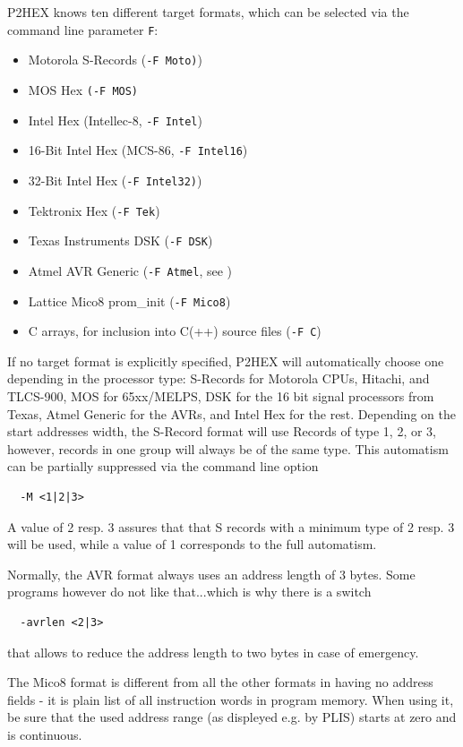 \documentclass[12pt,twoside]{report}
\newcommand{\tty}[1]{{\tt #1}}
\begin{document}
P2HEX knows ten different target formats, which can be selected via the
command line parameter \tty{F}:
\begin{itemize}
\item{Motorola S-Records (\tty{-F Moto)})}
\item{MOS Hex \tty{(-F MOS)}}
\item{Intel Hex (Intellec-8, \tty{-F Intel})}
\item{16-Bit Intel Hex (MCS-86, \tty{-F Intel16})}
\item{32-Bit Intel Hex (\tty{-F Intel32)})}
\item{Tektronix Hex (\tty{-F Tek})}
\item{Texas Instruments DSK (\tty{-F DSK})}
\item{Atmel AVR Generic (\tty{-F Atmel}, see \cite{AVRObj})}
\item{Lattice Mico8 prom\_init (\tty{-F Mico8})}
\item{C arrays, for inclusion into C(++) source files (\tty{-F C})}
\end{itemize}
If no target format is explicitly specified, P2HEX will automatically
choose one depending in the processor type:  S-Records for Motorola
CPUs, Hitachi, and TLCS-900, MOS for 65xx/MELPS, DSK for the 16 bit
signal processors from Texas, Atmel Generic for the AVRs, and Intel Hex
for the rest.  Depending on the start addresses width, the S-Record
format will use Records of type 1, 2, or 3, however, records in one
group will always be of the same type.  This automatism can be partially
suppressed via the command line option
\begin{verbatim}
  -M <1|2|3>
\end{verbatim}
A value of 2 resp. 3 assures that that S records with a minimum type of 2
resp. 3 will be used, while a value of 1 corresponds to the full
automatism.

Normally, the AVR format always uses an address length of 3 bytes.  Some
programs however do not like that...which is why there is a switch
\begin{verbatim}
  -avrlen <2|3>
\end{verbatim}
that allows to reduce the address length to two bytes in case of
emergency.

The Mico8 format is different from all the other formats in
having no address fields - it is plain list of all instruction
words in program memory.  When using it, be sure that the used
address range (as displeyed e.g. by PLIS) starts at zero and is
continuous.
\end{document}
